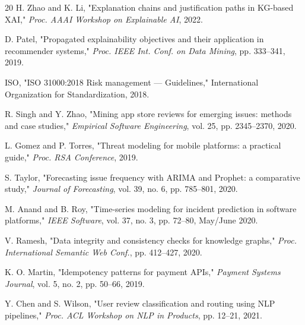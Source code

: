 \documentclass[conference]{IEEEtran}
\begin{document}
\begin{thebibliography}{20}
 H. Zhao and K. Li, "Explanation chains and justification paths in KG-based XAI," \emph{Proc. AAAI Workshop on Explainable AI}, 2022.

 D. Patel, "Propagated explainability objectives and their application in recommender systems," \emph{Proc. IEEE Int. Conf. on Data Mining}, pp. 333--341, 2019.

 ISO, "ISO 31000:2018 Risk management — Guidelines," International Organization for Standardization, 2018.

 R. Singh and Y. Zhao, "Mining app store reviews for emerging issues: methods and case studies," \emph{Empirical Software Engineering}, vol. 25, pp. 2345--2370, 2020.

 L. Gomez and P. Torres, "Threat modeling for mobile platforms: a practical guide," \emph{Proc. RSA Conference}, 2019.

 S. Taylor, "Forecasting issue frequency with ARIMA and Prophet: a comparative study," \emph{Journal of Forecasting}, vol. 39, no. 6, pp. 785--801, 2020.

 M. Anand and B. Roy, "Time-series modeling for incident prediction in software platforms," \emph{IEEE Software}, vol. 37, no. 3, pp. 72--80, May/June 2020.

 V. Ramesh, "Data integrity and consistency checks for knowledge graphs," \emph{Proc. International Semantic Web Conf.}, pp. 412--427, 2020.

 K. O. Martin, "Idempotency patterns for payment APIs," \emph{Payment Systems Journal}, vol. 5, no. 2, pp. 50--66, 2019.

 Y. Chen and S. Wilson, "User review classification and routing using NLP pipelines," \emph{Proc. ACL Workshop on NLP in Products}, pp. 12--21, 2021.

\end{thebibliography}
\end{document}
